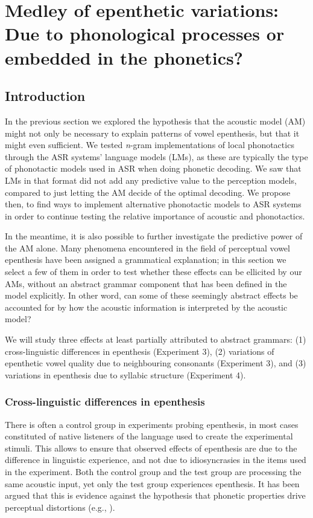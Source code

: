 {%
\newpage
\section{Medley of epenthetic variations: Due to phonological processes or embedded in the phonetics?} \label{3-medley}

\subsection{Introduction}
In the previous section we explored the hypothesis that the acoustic model (AM) might not only be necessary to explain patterns of vowel epenthesis, but that it might even sufficient. We tested \textit{n}-gram implementations of local phonotactics through the ASR systems' language models (LMs), as these are typically the type of phonotactic models used in ASR when doing phonetic decoding. We saw that LMs in that format did not add any predictive value to the perception models, compared to just letting the AM decide of the optimal decoding. We propose then, to find ways to implement alternative phonotactic models to ASR systems in order to continue testing the relative importance of acoustic and phonotactics.

In the meantime, it is also possible to further investigate the predictive power of the AM alone. Many phenomena encountered in the field of perceptual vowel epenthesis have been assigned a grammatical explanation; in this section we select a few of them in order to test whether these effects can be ellicited by our AMs, without an abstract grammar component that has been defined in the model explicitly. In other word, can some of these seemingly abstract effects be accounted for by how the acoustic information is interpreted by the acoustic model?

We will study three effects at least partially attributed to abstract grammars: (1) cross-linguistic differences in epenthesis (Experiment 3), (2) variations of epenthetic vowel quality due to neighbouring consonants (Experiment 3), and (3) variations in epenthesis due to syllabic structure (Experiment 4).

\subsubsection{Cross-linguistic differences in epenthesis}
There is often a control group in experiments probing epenthesis, in most cases constituted of native listeners of the language used to create the experimental stimuli. This allows to ensure that observed effects of epenthesis are due to the difference in linguistic experience, and not due to idiosyncrasies in the items used in the experiment. 
Both the control group and the test group are processing the same acoustic input, yet only the test group experiences epenthesis. It has been argued that this is evidence against the hypothesis that phonetic properties drive perceptual distortions (e.g., \cite{berent2007}).

}
